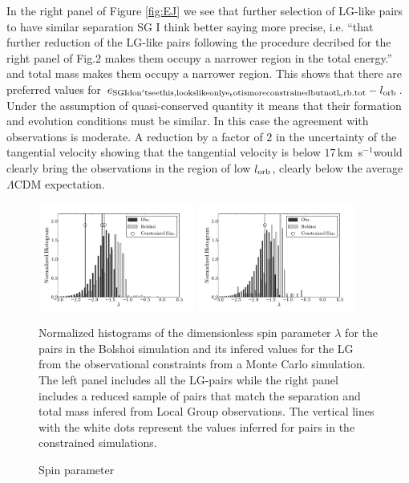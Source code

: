 \documentclass{emulateapj}
\newcommand{\kms}{\,km~s$^{-1}$}
\begin{document}
In the right panel of Figure \ref{fig:EJ} we see that further selection of LG-like pairs to have similar separation
SG I think better saying more precise, i.e.   ``that further reduction of the LG-like pairs following the procedure decribed for the right panel of Fig.2  makes them occupy a narrower region in the total energy.'' 
 and total mass makes them occupy a narrower region. This shows that there are preferred values for $e_{\rm
SG I don't see this, looks like only e_tot is more constrained but not l_orb.
 tot}-l_{\rm orb}$. Under the assumption of quasi-conserved quantity it means that their formation and evolution conditions must be similar. In this case the agreement with observations is moderate. A reduction by a factor of $2$ in the uncertainty of the tangential velocity showing that the tangential velocity is below $17$\kms would clearly bring the observations in the region of low $l_{\rm orb}$, clearly below the average $\Lambda$CDM expectation.


\begin{figure}
\begin{center}
\includegraphics[keepaspectratio=true,width=0.46\textwidth]{./figures/test_lambda.pdf}
\includegraphics[keepaspectratio=true,width=0.46\textwidth]{./figures/test_lambda_narrow.pdf}
\caption{{\rm \label{fig:lambda} Normalized histograms of the dimensionless spin parameter $\lambda$ for the pairs in the Bolshoi simulation and its infered values for the LG from the observational constraints from a Monte Carlo simulation. The left panel includes all the LG-pairs while the right panel includes a reduced sample of pairs that match the separation and total mass infered from Local Group observations. The vertical lines with the white dots represent the values inferred for pairs in the constrained simulations.}}
\caption{Spin parameter}
\label{fig:lambda}
\end{center}
\end{figure}
\end{document}

